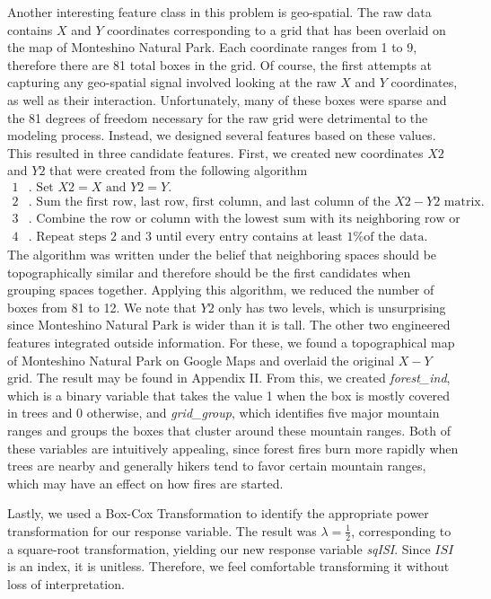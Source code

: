 \documentclass{article}
\begin{document}
Another interesting feature class in this problem is geo-spatial. The raw data contains $X$ and $Y$ coordinates corresponding to a grid that has been overlaid on the map of Monteshino Natural Park. Each coordinate ranges from 1 to 9, therefore there are 81 total boxes in the grid. Of course, the first attempts at capturing any geo-spatial signal involved looking at the raw $X$ and $Y$ coordinates, as well as their interaction. Unfortunately, many of these boxes were sparse and the 81 degrees of freedom necessary for the raw grid were detrimental to the modeling process. Instead, we designed several features based on these values. This resulted in three candidate features. First, we created new coordinates $X2$ and $Y2$ that were created from the following algorithm
\begin{align*}
1&. \text{ Set } X2 = X \text{ and } Y2 = Y. \\
2&. \text{ Sum the first row, last row, first column, and last column of the } X2-Y2 \text{ matrix.} \\
3&. \text{ Combine the row or column with the lowest sum with its neighboring row or column.} \\
4&. \text{ Repeat steps 2 and 3 until every entry contains at least 1\% of the data.}
\end{align*}
The algorithm was written under the belief that neighboring spaces should be topographically similar and therefore should be the first candidates when grouping spaces together. Applying this algorithm, we reduced the number of boxes from 81 to 12. We note that $Y2$ only has two levels, which is unsurprising since Monteshino Natural Park is wider than it is tall. The other two engineered features integrated outside information. For these, we found a topographical map of Monteshino Natural Park on Google Maps and overlaid the original $X-Y$ grid.  The result may be found in Appendix II. From this, we created \textit{forest\_ind}, which is a binary variable that takes the value 1 when the box is mostly covered in trees and 0 otherwise, and \textit{grid\_group}, which identifies five major mountain ranges and groups the boxes that cluster around these mountain ranges. Both of these variables are intuitively appealing, since forest fires burn more rapidly when trees are nearby and generally hikers tend to favor certain mountain ranges, which may have an effect on how fires are started. 

Lastly, we used a Box-Cox Transformation to identify the appropriate power transformation for our response variable. The result was $\lambda = \frac{1}{2}$, corresponding to a square-root transformation, yielding our new response variable \textit{sqISI}. Since $\textit{ISI}$ is an index, it is unitless. Therefore, we feel comfortable transforming it without loss of interpretation.
\end{document}
